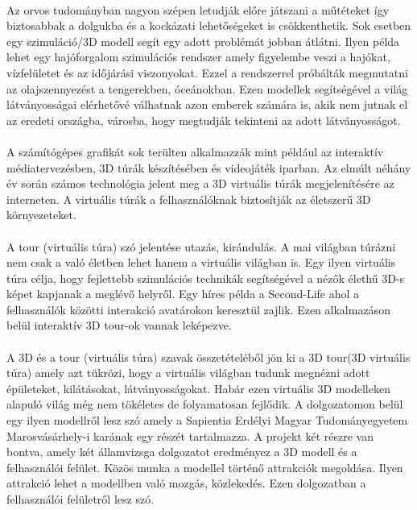 \paragraph{}
Az orvos tudományban nagyon szépen letudják előre játszani a műtéteket így biztosabbak a dolgukba és a kockázati lehetőségeket is csökkenthetik. Sok esetben egy szimuláció/3D modell segít egy adott problémát jobban átlátni. Ilyen példa lehet egy hajóforgalom szimulációs rendszer \cite{dedov2017design} amely figyelembe veszi a hajókat, vízfelületet és az időjárási viszonyokat. Ezzel a rendszerrel próbálták megmutatni az olajszennyezést a tengerekben, óceánokban. Ezen modellek segítségével a világ látványosságai elérhetővé válhatnak azon emberek számára is, akik nem jutnak el az eredeti országba, városba, hogy megtudják tekinteni az adott látványosságot.
\paragraph{}
A számítógépes grafikát \cite{moloo20163d} sok terülten alkalmazzák mint például az interaktív médiatervezésben, 3D túrák készítésében és videojáték iparban. Az elmúlt néhány év során számos technológia jelent meg a 3D virtuális túrák megjelenítésére az interneten. A virtuális túrák a felhasználóknak biztosítják az életszerű 3D környezeteket.
\paragraph{}
A tour (virtuális túra) szó jelentése utazás, kirándulás. A mai világban túrázni nem csak a való életben lehet hanem a virtuális világban is. Egy ilyen virtuális túra célja, hogy fejlettebb szimulációs technikák segítségével a nézők élethű 3D-s képet kapjanak a meglévő helyről. Egy híres példa a Second-Life ahol a felhasználók közötti interakció avatárokon keresztül zajlik. Ezen alkalmazáson belül interaktív 3D tour-ok vannak leképezve.\cite{moloo20163d}
\paragraph{}
A 3D és a tour (virtuális túra) szavak összetételéből jön ki a 3D tour(3D virtuális túra) amely azt tükrözi, hogy a virtuális világban tudunk megnézni adott épületeket, kilátásokat, látványosságokat. Habár ezen virtuális 3D modelleken alapuló világ még nem tökéletes de folyamatosan fejlődik. A dolgozatomon belül egy ilyen modellről lesz szó amely a Sapientia Erdélyi Magyar Tudományegyetem Marosvásárhely-i karának egy részét tartalmazza. A projekt két részre van bontva, amely két államvizsga dolgozatot eredményez a 3D modell és a felhasználói felület. Közös munka a modellel történő attrakciók megoldása. Ilyen attrakció lehet a modellben való mozgás, közlekedés. Ezen dolgozatban a felhasználói felületről lesz szó. 
